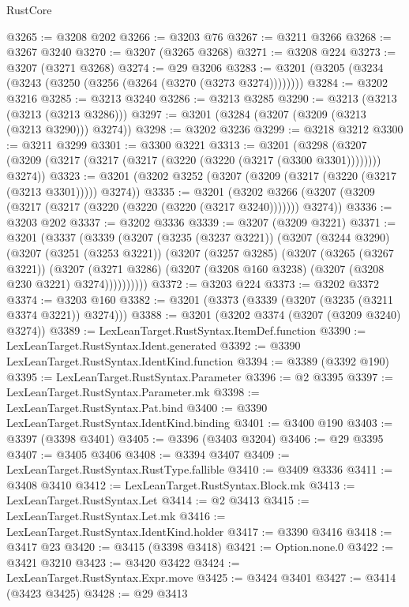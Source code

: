 \begin{lexlean}{RustCore}
\begin{coremodule}
@3265 := @3208 @202
@3266 := @3203 @76
@3267 := @3211 @3266
@3268 := @3267 @3240
@3270 := @3207 (@3265 @3268)
@3271 := @3208 @224
@3273 := @3207 (@3271 @3268)
@3274 := @29 @3206
@3283 := @3201 (@3205 (@3234 (@3243 (@3250 (@3256 (@3264 (@3270 (@3273 @3274))))))))
@3284 := @3202 @3216
@3285 := @3213 @3240
@3286 := @3213 @3285
@3290 := @3213 (@3213 (@3213 (@3213 @3286)))
@3297 := @3201 (@3284 (@3207 (@3209 (@3213 (@3213 @3290))) @3274))
@3298 := @3202 @3236
@3299 := @3218 @3212
@3300 := @3211 @3299
@3301 := @3300 @3221
@3313 := @3201
    (@3298 (@3207 (@3209 (@3217 (@3217 (@3217 (@3220 (@3220 (@3217 (@3300 @3301)))))))) @3274))
@3323 := @3201 (@3202 @3252 (@3207 (@3209 (@3217 (@3220 (@3217 (@3213 @3301))))) @3274))
@3335 := @3201
    (@3202 @3266 (@3207 (@3209 (@3217 (@3217 (@3220 (@3220 (@3220 (@3217 @3240))))))) @3274))
@3336 := @3203 @202
@3337 := @3202 @3336
@3339 := @3207 (@3209 @3221)
@3371 := @3201
    (@3337
      (@3339
        (@3207
          (@3235 (@3237 @3221))
          (@3207
            (@3244 @3290)
            (@3207
              (@3251 (@3253 @3221))
              (@3207
                (@3257 @3285)
                (@3207
                  (@3265 (@3267 @3221))
                  (@3207
                    (@3271 @3286)
                    (@3207 (@3208 @160 @3238) (@3207 (@3208 @230 @3221) @3274))))))))))
@3372 := @3203 @224
@3373 := @3202 @3372
@3374 := @3203 @160
@3382 := @3201 (@3373 (@3339 (@3207 (@3235 (@3211 @3374 @3221)) @3274)))
@3388 := @3201 (@3202 @3374 (@3207 (@3209 @3240) @3274))
@3389 := LexLeanTarget.RustSyntax.ItemDef.function
@3390 := LexLeanTarget.RustSyntax.Ident.generated
@3392 := @3390 LexLeanTarget.RustSyntax.IdentKind.function
@3394 := @3389 (@3392 @190)
@3395 := LexLeanTarget.RustSyntax.Parameter
@3396 := @2 @3395
@3397 := LexLeanTarget.RustSyntax.Parameter.mk
@3398 := LexLeanTarget.RustSyntax.Pat.bind
@3400 := @3390 LexLeanTarget.RustSyntax.IdentKind.binding
@3401 := @3400 @190
@3403 := @3397 (@3398 @3401)
@3405 := @3396 (@3403 @3204)
@3406 := @29 @3395
@3407 := @3405 @3406
@3408 := @3394 @3407
@3409 := LexLeanTarget.RustSyntax.RustType.fallible
@3410 := @3409 @3336
@3411 := @3408 @3410
@3412 := LexLeanTarget.RustSyntax.Block.mk
@3413 := LexLeanTarget.RustSyntax.Let
@3414 := @2 @3413
@3415 := LexLeanTarget.RustSyntax.Let.mk
@3416 := LexLeanTarget.RustSyntax.IdentKind.holder
@3417 := @3390 @3416
@3418 := @3417 @23
@3420 := @3415 (@3398 @3418)
@3421 := Option.none.{0}
@3422 := @3421 @3210
@3423 := @3420 @3422
@3424 := LexLeanTarget.RustSyntax.Expr.move
@3425 := @3424 @3401
@3427 := @3414 (@3423 @3425)
@3428 := @29 @3413

\end{coremodule}
\end{lexlean}
